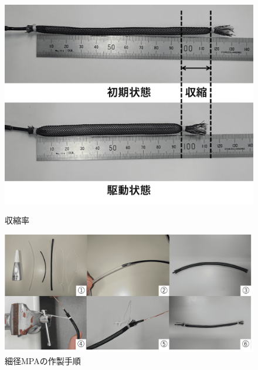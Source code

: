 \begin{figure}[t]
  \begin{minipage}{1\columnwidth}
    \centering
    \includegraphics[scale=0.1]{image/syusyuku.png}
    \vspace{-3mm}
    \caption{収縮率}
    \label{fig:syusyuku}
  \end{minipage}
  \begin{minipage}{1\columnwidth}
    \centering
    \vspace{3mm}
    \includegraphics[scale=0.3]{image/method.png}
    \caption{細径MPAの作製手順}
    \label{fig:method}
  \end{minipage}
\end{figure}
%
